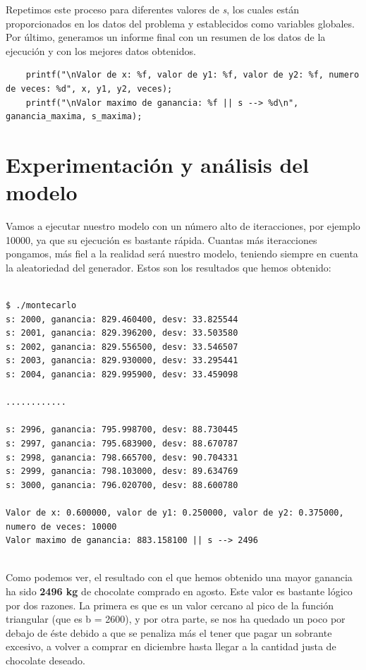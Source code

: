 \documentclass[11pt,a4paper]{article}
\begin{document}
Repetimos este proceso para diferentes valores de \textit{s}, los cuales están proporcionados en los datos del problema y establecidos como variables
globales. Por último, generamos un informe final con un resumen de los datos de la ejecución y con los mejores datos obtenidos.
\begin{lstlisting}
	printf("\nValor de x: %f, valor de y1: %f, valor de y2: %f, numero de veces: %d", x, y1, y2, veces);
	printf("\nValor maximo de ganancia: %f || s --> %d\n", ganancia_maxima, s_maxima);
\end{lstlisting}


\newpage
\section{Experimentación y análisis del modelo}

Vamos a ejecutar nuestro modelo con un número alto de iteracciones, por ejemplo 10000, ya que su ejecución es bastante rápida. Cuantas más iteracciones
pongamos, más fiel a la realidad será nuestro modelo, teniendo siempre en cuenta la aleatoriedad del generador. Estos son los resultados que hemos
obtenido:
\begin{lstlisting}

$ ./montecarlo
s: 2000, ganancia: 829.460400, desv: 33.825544
s: 2001, ganancia: 829.396200, desv: 33.503580
s: 2002, ganancia: 829.556500, desv: 33.546507
s: 2003, ganancia: 829.930000, desv: 33.295441
s: 2004, ganancia: 829.995900, desv: 33.459098

............

s: 2996, ganancia: 795.998700, desv: 88.730445
s: 2997, ganancia: 795.683900, desv: 88.670787
s: 2998, ganancia: 798.665700, desv: 90.704331
s: 2999, ganancia: 798.103000, desv: 89.634769
s: 3000, ganancia: 796.020700, desv: 88.600780

Valor de x: 0.600000, valor de y1: 0.250000, valor de y2: 0.375000,
numero de veces: 10000
Valor maximo de ganancia: 883.158100 || s --> 2496
	
\end{lstlisting}

Como podemos ver, el resultado con el que hemos obtenido una mayor ganancia ha sido \textbf{2496 kg} de chocolate comprado en agosto. Este valor es
bastante lógico por dos razones. La primera es que es un valor cercano al pico de la función triangular (que es b = 2600), y por otra parte, se nos ha
quedado un poco por debajo de éste debido a que se penaliza más el tener que pagar un sobrante excesivo, a volver a comprar en diciembre hasta llegar a
la cantidad justa de chocolate deseado.
\end{document}
